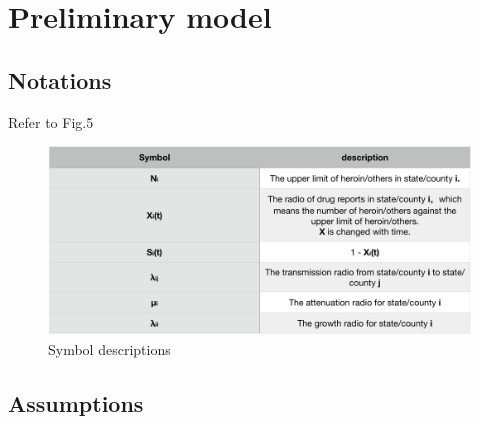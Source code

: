 \documentclass[12pt]{article}
\begin{document}
\section{Preliminary model}
\subsection{Notations}
Refer to Fig.5
\begin{figure}[!htbp]
\centering
\includegraphics[width=16cm]{Fig/notations}
\caption{Symbol descriptions}
\end{figure}

\subsection{Assumptions}
\end{document}
